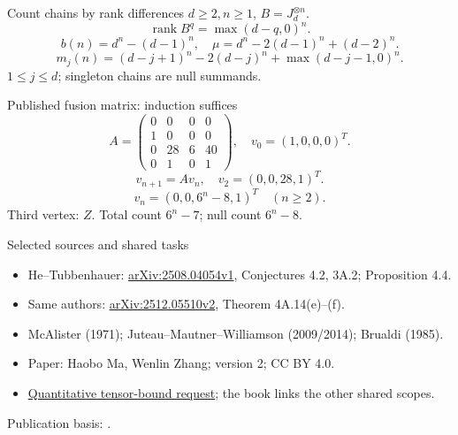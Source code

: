 \documentclass{beamer}
\begin{document}
\begin{frame}{Count chains by rank differences}
$d\geq2,n\geq1$, $B=J_d^{\otimes n}$.
\[
\operatorname{rank}B^q=\max(d-q,0)^n.
\]
\[
b(n)=d^n-(d-1)^n,\quad \mu=d^n-2(d-1)^n+(d-2)^n.
\]
\[
m_j(n)=(d-j+1)^n-2(d-j)^n+\max(d-j-1,0)^n.
\]
$1\leq j\leq d$; singleton chains are null summands.
\end{frame}
\begin{frame}{Published fusion matrix: induction suffices}
\[
A=\begin{pmatrix}0&0&0&0\\1&0&0&0\\0&28&6&40\\0&1&0&1\end{pmatrix},\quad v_0=(1,0,0,0)^T.
\]
\[
v_{n+1}=Av_n,\quad v_2=(0,0,28,1)^T.
\]
\[
v_n=(0,0,6^n-8,1)^T\quad(n\geq2).
\]
Third vertex: $Z$. Total count $6^n-7$; null count $6^n-8$.
\end{frame}
\begin{frame}{Selected sources and shared tasks}
\footnotesize
\begin{itemize}
\item He--Tubbenhauer: \href{https://arxiv.org/abs/2508.04054v1}{arXiv:2508.04054v1}, Conjectures 4.2, 3A.2; Proposition 4.4.
\item Same authors: \href{https://arxiv.org/abs/2512.05510v2}{arXiv:2512.05510v2}, Theorem 4A.14(e)--(f).
\item McAlister (1971); Juteau--Mautner--Williamson (2009/2014); Brualdi (1985).
\item Paper: Haobo Ma, Wenlin Zhang; version 2; CC BY 4.0.
\item \href{https://github.com/the-omega-institute/trureturing-requests/issues/45}{Quantitative tensor-bound request}; the book links the other shared scopes.
\end{itemize}
Publication basis: \PinnedCommit.
\end{frame}
\FormalVerification
\end{document}
